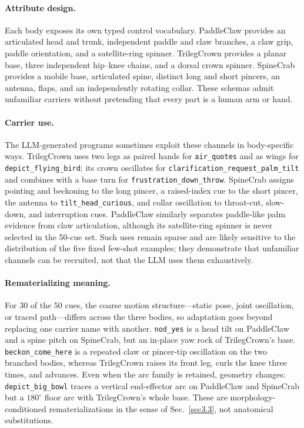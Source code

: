 \documentclass[letterpaper,10pt,conference]{ieeeconf}
\begin{document}
\paragraph{Attribute design.}
Each body exposes its own typed control vocabulary. PaddleClaw provides an articulated head and trunk, independent paddle and claw branches, a claw grip, paddle orientation, and a satellite-ring spinner. TrilegCrown provides a planar base, three independent hip--knee chains, and a dorsal crown spinner. SpineCrab provides a mobile base, articulated spine, distinct long and short pincers, an antenna, flaps, and an independently rotating collar. These schemas admit unfamiliar carriers without pretending that every part is a human arm or hand.

\paragraph{Carrier use.}
The LLM-generated programs sometimes exploit these channels in body-specific ways. TrilegCrown uses two legs as paired hands for \texttt{air\_quotes} and as wings for \texttt{depict\_flying\_bird}; its crown oscillates for \texttt{clarification\_request\_palm\_tilt} and combines with a base turn for \texttt{frustration\_down\_throw}. SpineCrab assigns pointing and beckoning to the long pincer, a raised-index cue to the short pincer, the antenna to \texttt{tilt\_head\_curious}, and collar oscillation to throat-cut, slow-down, and interruption cues. PaddleClaw similarly separates paddle-like palm evidence from claw articulation, although its satellite-ring spinner is never selected in the 50-cue set. Such uses remain sparse and are likely sensitive to the distribution of the five fixed few-shot examples; they demonstrate that unfamiliar channels can be recruited, not that the LLM uses them exhaustively.

\paragraph{Rematerializing meaning.}
For $30$ of the $50$ cues, the coarse motion structure---static pose, joint oscillation, or traced path---differs across the three bodies, so adaptation goes beyond replacing one carrier name with another. \texttt{nod\_yes} is a head tilt on PaddleClaw and a spine pitch on SpineCrab, but an in-place yaw rock of TrilegCrown's base. \texttt{beckon\_come\_here} is a repeated claw or pincer-tip oscillation on the two branched bodies, whereas TrilegCrown raises its front leg, curls the knee three times, and advances. Even when the arc family is retained, geometry changes: \texttt{depict\_big\_bowl} traces a vertical end-effector arc on PaddleClaw and SpineCrab but a $180^{\circ}$ floor arc with TrilegCrown's whole base. These are morphology-conditioned rematerializations in the sense of Sec.~\ref{sec3.3}, not anatomical substitutions.
\end{document}
